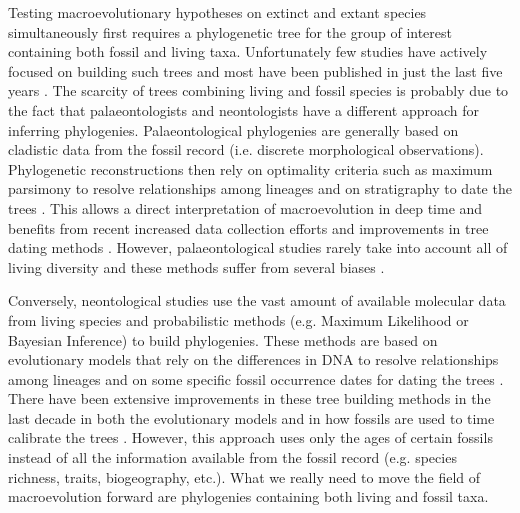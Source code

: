 
Testing macroevolutionary hypotheses on extinct and extant species simultaneously first requires a phylogenetic tree for the group of interest containing both fossil and living taxa.
Unfortunately few studies have actively focused on building such trees and most have been published in just the last five years \citep[e.g.][]{ronquista2012,Slater2012MEE,beckancient2014}.
The scarcity of trees combining living and fossil species is probably due to the fact that palaeontologists and neontologists have a different approach for inferring phylogenies.
Palaeontological phylogenies are generally based on cladistic data from the fossil record (i.e. discrete morphological observations).
Phylogenetic reconstructions then rely on optimality criteria such as maximum parsimony \citep{Hennig1966,felsenstein2004} to resolve relationships among lineages and on stratigraphy to date the trees \citep{GoloboffTNT}.
This allows a direct interpretation of macroevolution in deep time and benefits from recent increased data collection efforts \citep[e.g. 4541 characters in][introducing the term ``phenomics'']{O'Leary08022013} and improvements in tree dating methods \citep[e.g. the \textit{cal3} method from][]{Bapst2014}.
However, palaeontological studies rarely take into account all of living diversity \citep[e.g. only 38 out of 351 living primates are included with 119 fossils in][]{ni2013oldest} and these methods suffer from several biases \citep[e.g. evolution is not parsimonious;][]{wrightbayesian2014}.

Conversely, neontological studies use the vast amount of available molecular data from living species and probabilistic methods (e.g. Maximum Likelihood or Bayesian Inference) to build phylogenies.
These methods are based on evolutionary models that rely on the differences in DNA to resolve relationships among lineages and on some specific fossil occurrence dates for dating the trees \citep[i.e. the molecular clock;][]{zuckerkandl1965}.
There have been extensive improvements in these tree building methods in the last decade in both the evolutionary models \citep[e.g.][]{bapsta2013,stadlerdating2013,heaththe2013} and in how fossils are used to time calibrate the trees \citep{Donoghue2007424,Parham01032012}.
However, this approach uses only the ages of certain fossils instead of all the information available from the fossil record (e.g. species richness, traits, biogeography, etc.).
What we really need to move the field of macroevolution forward are phylogenies containing both living and fossil taxa.


